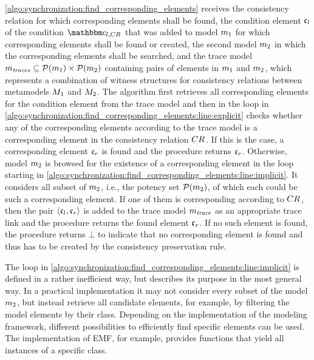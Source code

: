 \autoref{algo:synchronization:find_corresponding_elements} receives the consistency relation for which corresponding elements shall be found, the condition element $\conditionelement{c}{l}$ of the condition $\condition{c}{l,\consistencyrelation{CR}{}}$ that was added to model $\model{m}{1}$ for which corresponding elements shall be found or created, the second model $\model{m}{2}$ in which the corresponding elements shall be searched, and the trace model $\model{m}{\mathvariable{traces}} \subseteq \mathcal{P}(\model{m}{1}) \times \mathcal{P}(\model{m}{2})$ containing pairs of elements in $\model{m}{1}$ and $\model{m}{2}$, which represents a combination of witness structures for consistency relations between metamodels $\metamodel{M}{1}$ and $\metamodel{M}{2}$. 
The algorithm first retrieves all corresponding elements for the condition element from the trace model and then in the loop in \autoref{algo:synchronization:find_corresponding_elements:line:explicit} checks whether any of the corresponding elements according to the trace model is a corresponding element in the consistency relation $\consistencyrelation{CR}{}$.
If this is the case, a corresponding element $\conditionelement{c}{r}$ is found and the procedure returns $\conditionelement{c}{r}$.
Otherwise, model $\model{m}{2}$ is browsed for the existence of a corresponding element in the loop starting in \autoref{algo:synchronization:find_corresponding_elements:line:implicit}.
It considers all subset of $\model{m}{2}$, i.e., the potency set $\mathcal{P}(\model{m}{2})$, of which each could be such a corresponding element.
If one of them is corresponding according to $\consistencyrelation{CR}{}$, then the pair $\tupled{\conditionelement{c}{l},\conditionelement{c}{r}}$ is added to the trace model $\model{m}{\mathvariable{trace}}$ as an appropriate trace link and the procedure returns the found element $\conditionelement{c}{r}$.
If no such element is found, the procedure returns $\bot$ to indicate that no corresponding element is found and thus has to be created by the consistency preservation rule.

The loop in \autoref{algo:synchronization:find_corresponding_elements:line:implicit} is defined in a rather inefficient way, but describes its purpose in the most general way.
In a practical implementation it may not consider every subset of the model $\model{m}{2}$, but instead retrieve all candidate elements, for example, by filtering the model elements by their class.
Depending on the implementation of the modeling framework, different possibilities to efficiently find specific elements can be used.
The implementation of \gls{EMF}, for example, provides functions that yield all instances of a specific class.


